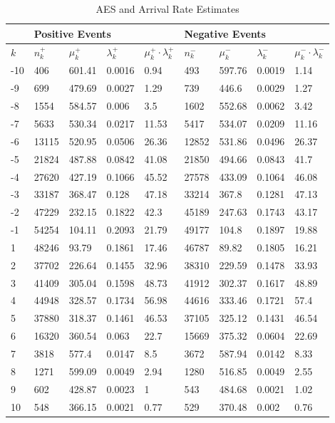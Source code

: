 \begin{table}[htbp]
\caption{AES and Arrival Rate Estimates} \label{tab:parameters}
\begin{center}
\begin{tabular}{l|llll|llll}
\hline \hline
 & \multicolumn{4}{l|}{\textbf{Positive Events}} & \multicolumn{4}{l}{\textbf{Negative Events}} \\
\hline
$k$   & $n_k^+$ & $\mu^+_k$ & $\lambda^+_k$ & $\mu^+_k \cdot \lambda^+_k$ & $n_k^-$  & $\mu^-_k$  & $\lambda^-_k$ & $\mu^-_k \cdot \lambda^-_k$  \\
\hline
-10 & 406   & 601.41 & 0.0016 & 0.94      & 493   & 597.76 & 0.0019 & 1.14       \\
-9  & 699   & 479.69 & 0.0027 & 1.29      & 739   & 446.6  & 0.0029 & 1.27       \\
-8  & 1554  & 584.57 & 0.006  & 3.5       & 1602  & 552.68 & 0.0062 & 3.42       \\
-7  & 5633  & 530.34 & 0.0217 & 11.53     & 5417  & 534.07 & 0.0209 & 11.16      \\
-6  & 13115 & 520.95 & 0.0506 & 26.36     & 12852 & 531.86 & 0.0496 & 26.37      \\
-5  & 21824 & 487.88 & 0.0842 & 41.08     & 21850 & 494.66 & 0.0843 & 41.7       \\
-4  & 27620 & 427.19 & 0.1066 & 45.52     & 27578 & 433.09 & 0.1064 & 46.08      \\
-3  & 33187 & 368.47 & 0.128  & 47.18     & 33214 & 367.8  & 0.1281 & 47.13      \\
-2  & 47229 & 232.15 & 0.1822 & 42.3      & 45189 & 247.63 & 0.1743 & 43.17      \\
-1  & 54254 & 104.11 & 0.2093 & 21.79     & 49177 & 104.8  & 0.1897 & 19.88      \\
1   & 48246 & 93.79  & 0.1861 & 17.46     & 46787 & 89.82  & 0.1805 & 16.21      \\
2   & 37702 & 226.64 & 0.1455 & 32.96     & 38310 & 229.59 & 0.1478 & 33.93      \\
3   & 41409 & 305.04 & 0.1598 & 48.73     & 41912 & 302.37 & 0.1617 & 48.89      \\
4   & 44948 & 328.57 & 0.1734 & 56.98     & 44616 & 333.46 & 0.1721 & 57.4       \\
5   & 37880 & 318.37 & 0.1461 & 46.53     & 37105 & 325.12 & 0.1431 & 46.54      \\
6   & 16320 & 360.54 & 0.063  & 22.7      & 15669 & 375.32 & 0.0604 & 22.69      \\
7   & 3818  & 577.4  & 0.0147 & 8.5       & 3672  & 587.94 & 0.0142 & 8.33       \\
8   & 1271  & 599.09 & 0.0049 & 2.94      & 1280  & 516.85 & 0.0049 & 2.55       \\
9   & 602   & 428.87 & 0.0023 & 1         & 543   & 484.68 & 0.0021 & 1.02       \\
10  & 548   & 366.15 & 0.0021 & 0.77      & 529   & 370.48 & 0.002  & 0.76      
\end{tabular}
\end{center}
\end{table}

